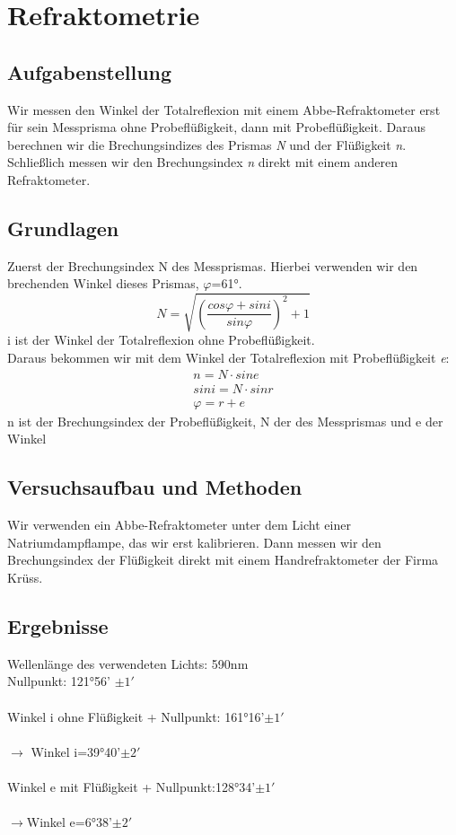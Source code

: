 \documentclass{article}
\begin{document}
\section{Refraktometrie}

\subsection{Aufgabenstellung}
Wir messen den Winkel der Totalreflexion mit einem Abbe-Refraktometer erst für sein Messprisma ohne Probeflüßigkeit, dann mit Probeflüßigkeit. Daraus berechnen wir die Brechungsindizes des Prismas \textit{N} und der Flüßigkeit \textit{n}. Schließlich messen wir den Brechungsindex \textit{n} direkt mit einem anderen Refraktometer. 
\subsection{Grundlagen}
Zuerst der Brechungsindex N des Messprismas. Hierbei verwenden wir den brechenden Winkel dieses Prismas, $\varphi$=61°.
\begin{equation}
\label{NMessprisma}
N=\sqrt{(\frac{cos\varphi + sin i}{sin \varphi})^2+1}
\end{equation}
i ist der Winkel der Totalreflexion ohne Probeflüßigkeit. \\
Daraus bekommen wir mit dem Winkel der Totalreflexion mit Probeflüßigkeit \textit{e}:
\begin{align}
\label{ns}
n=N \cdot sin e \\
sin i= N \cdot sin r \\
\varphi = r + e
\end{align}
n ist der Brechungsindex der Probeflüßigkeit, N der des Messprismas und e der Winkel 
\subsection{Versuchsaufbau und Methoden}
Wir verwenden ein Abbe-Refraktometer unter dem Licht einer Natriumdampflampe, das wir erst kalibrieren. Dann messen wir den Brechungsindex der Flüßigkeit direkt mit einem Handrefraktometer der Firma Krüss.
\subsection{Ergebnisse}
Wellenlänge des verwendeten Lichts: 590nm\\


Nullpunkt: 121°56' $\pm 1'$\\
\\
Winkel i ohne Flüßigkeit + Nullpunkt: 161°16'$\pm 1'$\\
\\
$\rightarrow$
Winkel i=39°40'$\pm 2'$\\
\\Winkel e mit Flüßigkeit + Nullpunkt:128°34'$\pm 1'$\\
\\
$\rightarrow$Winkel e=6°38'$\pm 2'$\\
\end{document}
